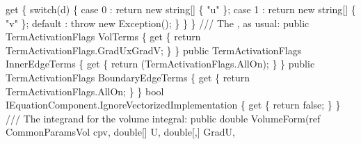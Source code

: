 {\btab \btab get \{ \newline 
\btab \btab \btab switch(d) \{\newline 
\btab \btab \btab \btab case 0  : return new string[] \{ "u" \}; \newline 
\btab \btab \btab \btab case 1  : return new string[] \{ "v" \}; \newline 
\btab \btab \btab \btab default : throw new Exception();\newline 
\btab \btab \btab \}\newline 
\btab \btab \} \newline 
\btab \}\newline 
 \newline 
    /// The , as usual:
\btab public TermActivationFlags VolTerms \{\newline 
\btab \btab get \{\newline 
\btab \btab \btab return TermActivationFlags.GradUxGradV;\newline 
\btab \btab \}\newline 
\btab \}\newline 
 \newline 
\btab public TermActivationFlags InnerEdgeTerms \{\newline 
\btab \btab get \{\newline 
\btab \btab \btab return (TermActivationFlags.AllOn);\newline 
\btab \btab \}\newline 
\btab \}\newline 
 \newline 
\btab public TermActivationFlags BoundaryEdgeTerms \{\newline 
\btab    get \{\newline 
\btab \btab    return TermActivationFlags.AllOn;\newline 
\btab \btab \}\newline 
\btab \}\newline 
 \newline 
 \btab bool IEquationComponent.IgnoreVectorizedImplementation \{ \newline 
 \btab \btab get \{ return false; \} \newline 
 \btab \}\newline 
    /// The integrand for the volume integral:
\btab public double VolumeForm(ref CommonParamsVol cpv, \newline 
\btab \btab    double[] U, double[,] GradU,\newline 
}
